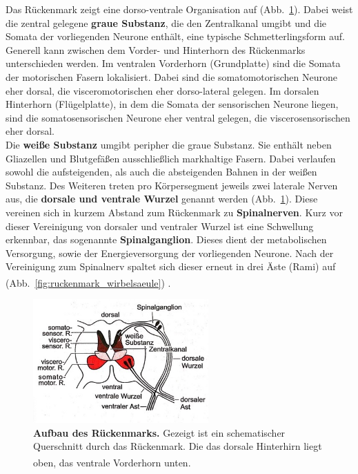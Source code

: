 \documentclass[12pt,a4paper,pdftex]{article}
\begin{document}
Das Rückenmark zeigt eine dorso-ventrale Organisation auf (Abb.~\ref{fig:ruckenmark_schema}). Dabei weist die zentral gelegene \textbf{graue Substanz}, die den Zentralkanal umgibt und die Somata der vorliegenden Neurone enthält, eine typische Schmetterlingsform auf. Generell kann zwischen dem Vorder- und Hinterhorn des Rückenmarks unterschieden werden. Im ventralen Vorderhorn (Grundplatte) sind die Somata der motorischen Fasern lokalisiert. Dabei sind die somatomotorischen Neurone eher dorsal, die visceromotorischen eher dorso-lateral gelegen. Im dorsalen Hinterhorn (Flügelplatte), in dem die Somata der sensorischen Neurone liegen, sind die somatosensorischen Neurone eher ventral gelegen, die viscerosensorischen eher dorsal.\\

\noindent Die \textbf{weiße Substanz} umgibt peripher die graue Substanz. Sie enthält neben Gliazellen und Blutgefäßen ausschließlich markhaltige Fasern. Dabei verlaufen sowohl die aufsteigenden, als auch die absteigenden Bahnen in der weißen Substanz. Des Weiteren treten pro Körpersegment jeweils zwei laterale Nerven aus, die \textbf{dorsale und ventrale Wurzel} genannt werden (Abb.~\ref{fig:ruckenmark_schema}). Diese vereinen sich in kurzem Abstand zum Rückenmark zu \textbf{Spinalnerven}. Kurz vor dieser Vereinigung von dorsaler und ventraler Wurzel ist eine Schwellung erkennbar, das sogenannte \textbf{Spinalganglion}. Dieses dient der metabolischen Versorgung, sowie der Energieversorgung der vorliegenden Neurone. Nach der Vereinigung zum Spinalnerv spaltet sich dieser erneut in drei Äste (Rami) auf (Abb.~\ref{fig:ruckenmark_wirbelsaeule}) \textsuperscript{\cite[14]{penzlin2005tierphys}}.

\begin{figure}[H]
     \centering
     \includegraphics[width=0.6\textwidth]{pictures/Bilder_Jule/Andere/rueckenmark_schema.jpg}
     \caption[Aufbau des Rückenmarks]{\textbf{Aufbau des Rückenmarks.} Gezeigt ist ein schematischer Querschnitt durch das Rückenmark. Die das dorsale Hinterhirn liegt oben, das ventrale Vorderhorn unten. \textsuperscript{\cite[14]{penzlin2005tierphys}}}
     \label{fig:ruckenmark_schema}
 \end{figure}{}
\end{document}
